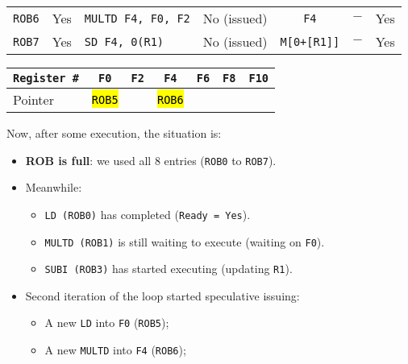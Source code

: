 \begin{examplebox}
\begin{itemize}
\begin{center}
\begin{adjustbox}{width={.92\textwidth},totalheight={\textheight},keepaspectratio}
\begin{tabular}{@{} c | c | l | l | c | c | c @{}}
                    \texttt{ROB6}       & Yes               & \texttt{MULTD F4, F0, F2} & No (issued)           & \texttt{F4}           & $-$                   & Yes               \\ [.3em]
                    \texttt{ROB7}       & Yes               & \texttt{SD F4, 0(R1)}     & No (issued)           & \texttt{M[0+[R1]]}    & $-$                   & Yes               \\
                    \bottomrule
                \end{tabular}
            \end{adjustbox}
            \begin{tabular}{@{} l | c c c c c c @{}}
                \toprule
                \texttt{Register \#}    & \texttt{F0}           & \texttt{F2}   & \texttt{F4}           & \texttt{F6}   & \texttt{F8}   & \texttt{F10}  \\
                \midrule
                Pointer                 & \hl{\texttt{ROB5}}    &               & \hl{\texttt{ROB6}}    &               &               &               \\
                \bottomrule
            \end{tabular}
        \end{center}
        Now, after some execution, the situation is:
        \begin{itemize}
            \item \textbf{ROB is full}:  we used all 8 entries (\texttt{ROB0} to \texttt{ROB7}).
            \item Meanwhile:
            \begin{itemize}
                \item \texttt{LD (ROB0)} has completed (\texttt{Ready = Yes}).
                \item \texttt{MULTD (ROB1)} is still waiting to execute (waiting on \texttt{F0}).
                \item \texttt{SUBI (ROB3)} has started executing (updating \texttt{R1}).
            \end{itemize}
            \item Second iteration of the loop started speculative issuing:
            \begin{itemize}
                \item A new \texttt{LD} into \texttt{F0} (\texttt{ROB5});
                \item A new \texttt{MULTD} into \texttt{F4} (\texttt{ROB6});

\end{itemize}
\end{itemize}
\end{itemize}
\end{examplebox}
